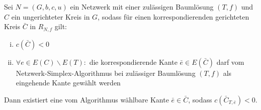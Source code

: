 \begin{lem}\label{iterierbar}Sei $N=(G,b,c,u)$ ein Netzwerk mit einer zulässigen Baumlösung $(T,f)$ und $C$ ein ungerichteter Kreis in $G$, sodass für einen korrespondierenden gerichteten Kreis $\bar{C}$ in $R_{N,f}$ gilt:
\begin{enumerate}[(i)]
	\item $c(\bar{C})<0$\label{negativ}
	\item $\forall e\in E(C)\backslash E(T) \colon$ die korrespondierende Kante $\bar{e}\in E(\bar{C})$ darf vom Netzwerk-Simplex-Algorithmus bei zulässiger Baumlösung $(T,f)$ als eingehende Kante gewählt werden\label{wählbar}
\end{enumerate}
Dann existiert eine vom Algorithmus wählbare Kante $\bar{e}\in\bar{C}$, sodass $c(\bar{C}_{T,\bar{e}})<0$.
\end{lem}
